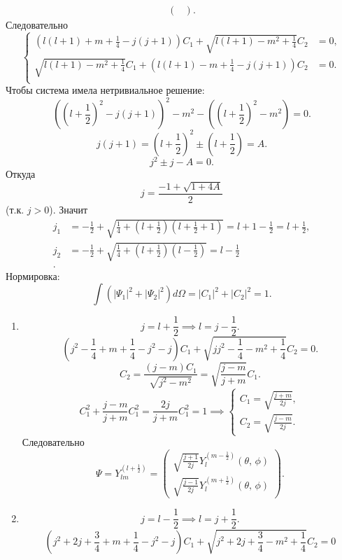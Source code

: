 \documentclass[a4paper]{article}
\begin{document}
\begin{sol}
\begin{enumerate}
\begin{multline*}
\begin{pmatrix}
 \end{pmatrix} .\end{multline*} 
Следовательно
\[
\left\{
\begin{aligned}
	\left( l(l+1)+m+\frac{1}{4}-j(j+1) \right) C_1 +\sqrt{l(l+1)-m^2+\frac{1}{4}} C_2&= 0 ,\\
	\sqrt{l(l+1)-m^2+\frac{1}{4}} C_1+
	\left( l(l+1)-m+\frac{1}{4}-j(j+1) \right) C_2&= 0 .\\
\end{aligned}
\right.
\] 
Чтобы система имела нетривиальное решение:
\[
	\left( \left( l+\frac{1}{2} \right) ^2-
	j(j+1)\right) ^2-m^2 - \left( 
\left( l+\frac{1}{2} \right) ^2-m^2\right) =0
.\] 
\[
	j(j+1)= \left( l+\frac{1}{2} \right) ^2
	\pm  \left( l+\frac{1}{2} \right) =A
.\] 
\[
j^2\pm j-A=0
.\] 
Откуда
\[
j= \frac{-1+ \sqrt{1+4A} }{2}
\]
(т.\:к. $j>0$). Значит
\begin{align*}
	j_1 &= -\frac{1}{2}+ \sqrt{\frac{1}{4}+
	\left( l+\frac{1}{2} \right) \left( 
l+\frac{1}{2}+1\right) } =
l+1-\frac{1}{2}=l+\frac{1}{2},\\
		j_2&= -\frac{1}{2} + \sqrt{\frac{1}{4}+\left( 
		l+\frac{1}{2}\right) \left( 
l-\frac{1}{2}\right) } =l-\frac{1}{2}\\
.\end{align*}
Нормировка:
\[
	\int \left( |\Psi_1|^2+
	|\Psi_2|^2\right) d\Omega=|C_1|^2+|C_2|^2=1
.\] 
\renewcommand{\labelenumii}{\arabic{enumii})}
\begin{enumerate}
\item \[
j=l+\frac{1}{2}\implies l=j-\frac{1}{2}
.\] 
\[
	\left( j^2-\frac{1}{4}+m+\frac{1}{4}-j^2-j \right) C_1+\sqrt{jj^2-\frac{1}{4}-m^2+\frac{1}{4}}
	C_2=0
.\] 
\[
	C_2= \frac{(j-m)C_1}{\sqrt{j^2-m^2} }=
	\sqrt{\frac{j-m}{j+m}} C_1
.\] 
\[
C_1^2+\frac{j-m}{j+m}C_1^2=\frac{2j}{j+m}C_1^2=1
\implies \left\{
\begin{aligned}
C_1= \sqrt{\frac{j+m}{2j}} ,\\
C_2= \sqrt{\frac{j-m}{2j}}. 
\end{aligned}
\right. 
\] 
Следовательно
\[
	\Psi= Y_{lm}^{\left( l+\frac{1}{2} \right) }=
	\begin{pmatrix} \sqrt{\frac{j+1}{2j}} 
	Y_l^{\left( m-\frac{1}{2} \right)} (\theta,\,\phi)\\
\sqrt{\frac{j-1}{2j}} Y_l^{\left( m+\frac{1}{2} \right) }(\theta,\,\phi)\end{pmatrix} 
.\] 
\item \[
j=l-\frac{1}{2}\implies l=j+\frac{1}{2}
.\] 
\[
	\left( j^2+2j+\frac{3}{4}+m+\frac{1}{4}-j^2-j \right) C_1+ \sqrt{j^2+2j+\frac{3}{4}-m^2+\frac{1}{4}} C_2=0
\]
\end{enumerate}
\end{enumerate}
\end{sol}
\end{document}
